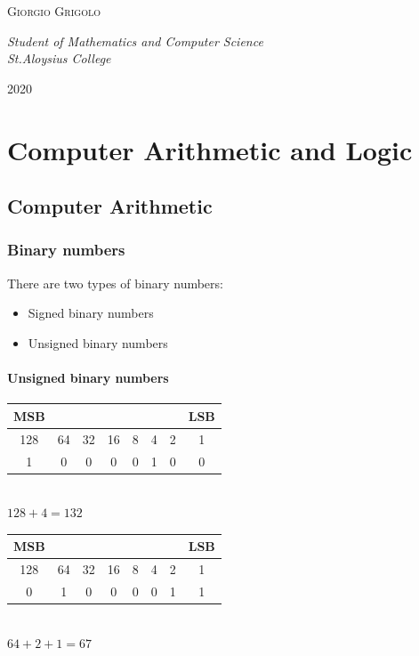 \documentclass[12pt, a4paper]{report}
\begin{document}
\begin{titlepage}
		{\scshape\Large Giorgio Grigolo \\ } %
		
		\vspace{0.5\baselineskip} %
		
		\textit{Student of Mathematics and Computer Science \\St.Aloysius College } %
		
		\vfill %
		
		
		
		\vspace{0.3\baselineskip} %
		
		2020 %
		
	\end{titlepage}
	\tableofcontents
	\newpage
	\part{Computer Arithmetic and Logic}
	\chapter{Computer Arithmetic}
	\section{Binary numbers}
	There are two types of binary numbers: 
	\begin{itemize}
		\item{Signed binary numbers}
		\item{Unsigned binary numbers}
	\end{itemize}
	\subsection{Unsigned binary numbers}
	\begin{center}
		\begin{tabular}{cccccccc}
			MSB &    &    &    &   &   &   & LSB \\ \hline
			128 & 64 & 32 & 16 & 8 & 4 & 2 & 1   \\ \hline
			1   & 0  & 0  & 0  & 0 & 1 & 0 & 0   
		\end{tabular}\\
		$128 +4 = 132$
	\end{center}
	\begin{center}
		\begin{tabular}{cccccccc}
			MSB &    &    &    &   &   &   & LSB \\ \hline
			128 & 64 & 32 & 16 & 8 & 4 & 2 & 1   \\ \hline
			0   & 1  & 0  & 0  & 0 & 0 & 1 & 1   
		\end{tabular}\\
		$64+2+1=67$
	\end{center}
	
\end{document}
